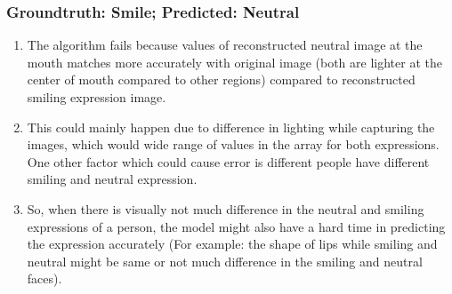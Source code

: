 \documentclass[11pt,letterpaper]{article}
\begin{document}
\subsubsection*{Groundtruth: Smile; Predicted: Neutral}
\begin{enumerate}
    [label=$\bullet$]
    \item The algorithm fails because values of reconstructed neutral image at the mouth matches more accurately with original image (both are lighter at the center of mouth compared to other regions) compared to reconstructed smiling expression image. 
    \item This could mainly happen due to difference in lighting while capturing the images, which would wide range of values in the array for both expressions. One other factor which could cause error is different people have different smiling and neutral expression. 
    \item So, when there is visually not much difference in the neutral and smiling expressions of a person, the model might also have a hard time in predicting the expression accurately (For example: the shape of lips while smiling and neutral might be same or not much difference in the smiling and neutral faces).
\end{enumerate}
\newpage
\end{document}
